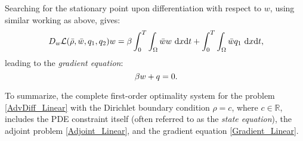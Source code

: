 
Searching for the stationary point upon differentiation with respect to $w$, using similar working as above, gives:
\begin{equation*}
\ D_w\mathcal{L}(\bar{\rho},\bar{w},\adj_1,\adj_2)w=\beta\int_0^T\int_{\Omega}\bar{w}w~{\rm d}x{\rm d}t+\int_0^T\int_{\Omega}\bar{w}\adj_1~{\rm d}x{\rm d}t,
\end{equation*}
leading to the \emph{gradient equation}:
\begin{equation}
\ \label{Gradient_Linear} \beta{}w+\adj=0.
\end{equation}

To summarize, the complete first-order optimality system for the problem \eqref{AdvDiff_Linear} with the Dirichlet boundary condition $\rho=c$, where $c \in \mathbb{R}$, includes the PDE constraint itself (often referred to as the \emph{state equation}), the adjoint problem \eqref{Adjoint_Linear}, and the gradient equation \eqref{Gradient_Linear}.

